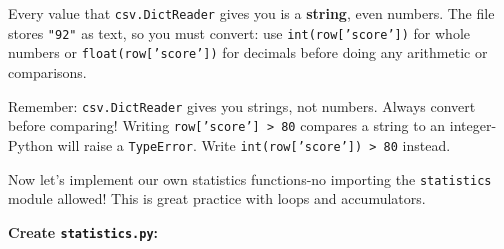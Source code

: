 \documentclass{cslab}
\begin{document}
\begin{hint}
Every value that \texttt{csv.DictReader} gives you is a \textbf{string}, even numbers. The file stores \texttt{"92"} as text, so you must convert: use \texttt{int(row['score'])} for whole numbers or \texttt{float(row['score'])} for decimals before doing any arithmetic or comparisons.
\end{hint}

\begin{warning}
Remember: \texttt{csv.DictReader} gives you strings, not numbers. Always convert before comparing! Writing \texttt{row['score'] > 80} compares a string to an integer-Python will raise a \texttt{TypeError}. Write \texttt{int(row['score']) > 80} instead.
\end{warning}


Now let's implement our own statistics functions-no importing the \texttt{statistics} module allowed! This is great practice with loops and accumulators.

\textbf{Create \texttt{statistics.py}:}
\end{document}
